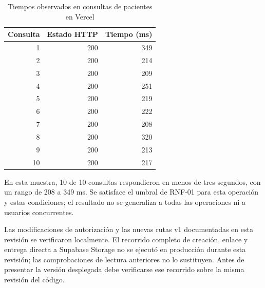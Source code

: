 \documentclass[12pt,letterpaper]{report}
\begin{document}
\begin{table}[H]\centering
\caption{Tiempos observados en consultas de pacientes en Vercel}
\begin{tabular}{rrr}\toprule
\textbf{Consulta}&\textbf{Estado HTTP}&\textbf{Tiempo (ms)}\\\midrule
1&200&349\\
2&200&214\\
3&200&209\\
4&200&251\\
5&200&219\\
6&200&222\\
7&200&208\\
8&200&320\\
9&200&213\\
10&200&217\\
\bottomrule\end{tabular}\end{table}
En esta muestra, 10 de 10 consultas respondieron en menos de tres
segundos, con un rango de 208 a 349 ms.
Se satisface el umbral de RNF-01 para esta operación y estas condiciones;
el resultado no se generaliza a todas las operaciones ni a usuarios concurrentes.

Las modificaciones de autorización y las nuevas rutas v1 documentadas en esta
revisión se verificaron localmente. El recorrido completo de creación,
enlace y entrega directa a Supabase Storage no se ejecutó en producción
durante esta revisión; las comprobaciones de lectura anteriores no lo
sustituyen. Antes de presentar la versión desplegada debe verificarse ese
recorrido sobre la misma revisión del código.
\end{document}
